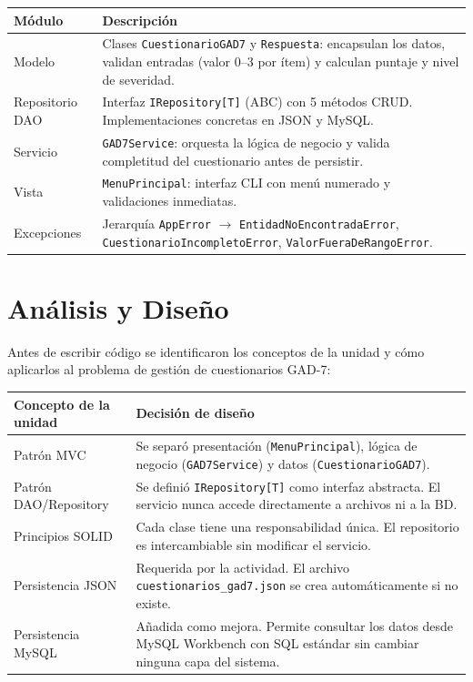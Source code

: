 \documentclass[12pt, a4paper]{article}
\begin{document}
\vspace{0.5em}
\begin{tabular}{L{3.5cm} L{10.5cm}}
  \toprule
  \textbf{Módulo} & \textbf{Descripción} \\
  \midrule
  Modelo &
    Clases \texttt{CuestionarioGAD7} y \texttt{Respuesta}: encapsulan los datos,
    validan entradas (valor 0--3 por ítem) y calculan puntaje y nivel de severidad. \\[6pt]
  Repositorio DAO &
    Interfaz \texttt{IRepository[T]} (ABC) con 5 métodos CRUD. Implementaciones
    concretas en JSON y MySQL. \\[6pt]
  Servicio &
    \texttt{GAD7Service}: orquesta la lógica de negocio y valida completitud del
    cuestionario antes de persistir. \\[6pt]
  Vista &
    \texttt{MenuPrincipal}: interfaz CLI con menú numerado y validaciones inmediatas. \\[6pt]
  Excepciones &
    Jerarquía \texttt{AppError} $\rightarrow$ \texttt{EntidadNoEncontradaError},
    \texttt{CuestionarioIncompletoError}, \texttt{ValorFueraDeRangoError}. \\
  \bottomrule
\end{tabular}

\section{Análisis y Diseño}

Antes de escribir código se identificaron los conceptos de la unidad y cómo
aplicarlos al problema de gestión de cuestionarios GAD-7:

\vspace{0.5em}
\begin{tabular}{L{4cm} L{10cm}}
  \toprule
  \textbf{Concepto de la unidad} & \textbf{Decisión de diseño} \\
  \midrule
  Patrón MVC &
    Se separó presentación (\texttt{MenuPrincipal}), lógica de negocio
    (\texttt{GAD7Service}) y datos (\texttt{CuestionarioGAD7}). \\[6pt]
  Patrón DAO/Repository &
    Se definió \texttt{IRepository[T]} como interfaz abstracta. El servicio
    nunca accede directamente a archivos ni a la BD. \\[6pt]
  Principios SOLID &
    Cada clase tiene una responsabilidad única. El repositorio es
    intercambiable sin modificar el servicio. \\[6pt]
  Persistencia JSON &
    Requerida por la actividad. El archivo \texttt{cuestionarios\_gad7.json}
    se crea automáticamente si no existe. \\[6pt]
  Persistencia MySQL &
    Añadida como mejora. Permite consultar los datos desde MySQL Workbench
    con SQL estándar sin cambiar ninguna capa del sistema. \\
  \bottomrule
\end{tabular}
\end{document}

